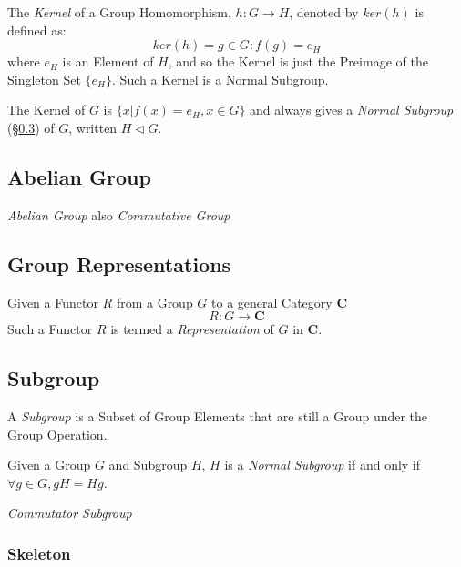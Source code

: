 The \emph{Kernel} of a Group Homomorphism, $h : G \rightarrow H$,
denoted by $ker(h)$ is defined as:
\[
    ker(h) = {g \in G : f(g) = e_H}
\]
where $e_H$ is an Element of $H$, and so the Kernel is just the
Preimage of the Singleton Set $\{e_H\}$. Such a Kernel is a Normal
Subgroup.

The Kernel of $G$ is $\{x | f(x)=e_H, x \in G\}$ and always
gives a \emph{Normal Subgroup} (\S\ref{sec:subgroup}) of $G$,
written $H \triangleleft G$.



\subsection{Abelian Group}\label{sec:abelian_group}

\emph{Abelian Group} also \emph{Commutative Group}



\subsection{Group Representations}\label{sec:group_representation}

Given a Functor $R$ from a Group $G$ to a general Category
$\mathbf{C}$
\[
    R : G \rightarrow \mathbf{C}
\]
Such a Functor $R$ is termed a \emph{Representation} of $G$ in
$\mathbf{C}$.



\subsection{Subgroup}\label{sec:subgroup}

A \emph{Subgroup} is a Subset of Group Elements that are still a Group
under the Group Operation.

Given a Group $G$ and Subgroup $H$, $H$ is a \emph{Normal Subgroup} if
and only if $\forall g \in G, gH = Hg$.

\emph{Commutator Subgroup}

\subsubsection{Skeleton}

